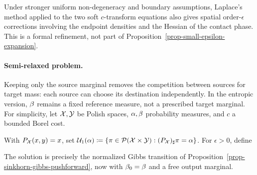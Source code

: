 Under stronger uniform non-degeneracy and boundary assumptions, Laplace's method applied to the two soft $c$-transform equations also gives spatial order-$\epsilon$ corrections involving the endpoint densities and the Hessian of the contact phase. This is a formal refinement, not part of Proposition~\ref{prop-small-epsilon-expansion}.

\paragraph{Semi-relaxed problem.}\label{par-entropic-semi-relaxed}
Keeping only the source marginal removes the competition between sources for target mass: each source can choose its destination independently. In the entropic version, $\beta$ remains a fixed reference measure, not a prescribed target marginal. For simplicity, let $\mathcal{X},\mathcal{Y}$ be Polish spaces, $\alpha,\beta$ probability measures, and $c$ a bounded Borel cost.

\begin{defn}\label{def-entropic-semi-relaxed}
With $P_{\mathcal{X}}(x,y)=x$, set $\mathcal{U}_1(\alpha)\coloneqq\{\pi\in\mathcal{P}(\mathcal{X}\times\mathcal{Y}):(P_{\mathcal{X}})_\sharp\pi=\alpha\}$. For $\epsilon>0$, define
\end{defn}
The solution is precisely the normalized Gibbs transition of Proposition~\ref{prop-sinkhorn-gibbs-pushforward}, now with $\beta_0=\beta$ and a free output marginal.

